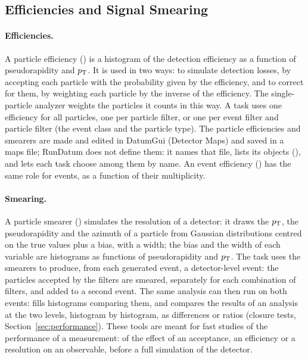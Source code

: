 \subsection{Efficiencies and Signal Smearing}
\label{sec:efficiency}

\paragraph{Efficiencies.}
A particle efficiency () is a histogram of the detection efficiency as a function of
pseudorapidity and $p_{\mathrm{T}}$. It is used in two ways: to simulate detection losses, by accepting each particle with the
probability given by the efficiency, and to correct for them, by weighting each particle by the inverse of the
efficiency. The single-particle analyzer weights the particles it counts in this way. A task uses one efficiency for
all particles, one per particle filter, or one per event filter and particle filter (the event class and the particle
type). The particle efficiencies and smearers are made and edited in DatumGui (Detector Maps) and saved in a maps file;
RunDatum does not define them: it names that file, lists its objects (), and lets each task choose
among them by name. An event efficiency () has the same role for events, as a
function of their multiplicity.

\paragraph{Smearing.}
A particle smearer () simulates the resolution of a detector: it draws the $p_{\mathrm{T}}$, the
pseudorapidity and the azimuth of a particle from Gaussian distributions centred on the true values plus a bias, with
a width; the bias and the width of each variable are histograms as functions of pseudorapidity and $p_{\mathrm{T}}$. The task
 uses the smearers to produce, from each generated event, a detector-level event: the
particles accepted by the filters are smeared, separately for each combination of filters, and added to a second
event. The same analysis can then run on both events:  fills histograms comparing them, and
 compares the results of an analysis at the two levels, histogram by histogram, as differences
or ratios (closure tests, Section~\ref{sec:performance}). These tools are meant for fast studies of the performance of
a measurement: of the effect of an acceptance, an efficiency or a resolution on an observable, before a full simulation
of the detector.

